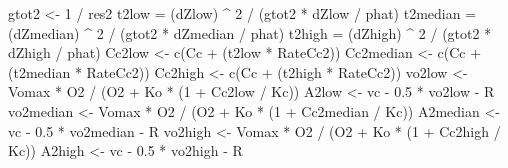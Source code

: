 \documentclass[
]{krantz}
\makeatletter
\newenvironment{Shaded}{\begin{snugshade}}{\end{snugshade}}
\newcommand{\DecValTok}[1]{\textcolor[rgb]{0.00,0.00,0.81}{#1}}
\newcommand{\FloatTok}[1]{\textcolor[rgb]{0.00,0.00,0.81}{#1}}
\newcommand{\FunctionTok}[1]{\textcolor[rgb]{0.00,0.00,0.00}{#1}}
\newcommand{\NormalTok}[1]{#1}
\newcommand{\OtherTok}[1]{\textcolor[rgb]{0.56,0.35,0.01}{#1}}
\newcommand{\SpecialCharTok}[1]{\textcolor[rgb]{0.00,0.00,0.00}{#1}}
\newenvironment{kframe}{%
\medskip{}
\setlength{\fboxsep}{.8em}
 \def\at@end@of@kframe{}%
 \ifinner\ifhmode%
  \def\at@end@of@kframe{\end{minipage}}%
  \begin{minipage}{\columnwidth}%
 \fi\fi%
 \def\FrameCommand##1{\hskip\@totalleftmargin \hskip-\fboxsep
 \colorbox{shadecolor}{##1}\hskip-\fboxsep
     \hskip-\linewidth \hskip-\@totalleftmargin \hskip\columnwidth}%
 \MakeFramed {\advance\hsize-\width
   \@totalleftmargin\z@ \linewidth\hsize
   \@setminipage}}%
 {\par\unskip\endMakeFramed%
 \at@end@of@kframe}
\renewenvironment{Shaded}{\begin{kframe}}{\end{kframe}}
\makeatother
\begin{document}
\begin{Shaded}
\begin{Highlighting}[]
\NormalTok{gtot2 }\OtherTok{\textless{}{-}} \DecValTok{1} \SpecialCharTok{/}\NormalTok{ res2}
\NormalTok{t2low }\OtherTok{=}\NormalTok{ (dZlow) }\SpecialCharTok{\^{}} \DecValTok{2} \SpecialCharTok{/}\NormalTok{ (gtot2 }\SpecialCharTok{*}\NormalTok{ dZlow }\SpecialCharTok{/}\NormalTok{ phat)}
\NormalTok{t2median }\OtherTok{=}\NormalTok{ (dZmedian) }\SpecialCharTok{\^{}} \DecValTok{2} \SpecialCharTok{/}\NormalTok{ (gtot2 }\SpecialCharTok{*}\NormalTok{ dZmedian }\SpecialCharTok{/}\NormalTok{ phat)}
\NormalTok{t2high }\OtherTok{=}\NormalTok{ (dZhigh) }\SpecialCharTok{\^{}} \DecValTok{2} \SpecialCharTok{/}\NormalTok{ (gtot2 }\SpecialCharTok{*}\NormalTok{ dZhigh }\SpecialCharTok{/}\NormalTok{ phat)}
\NormalTok{Cc2low }\OtherTok{\textless{}{-}} \FunctionTok{c}\NormalTok{(Cc }\SpecialCharTok{+}\NormalTok{ (t2low }\SpecialCharTok{*}\NormalTok{ RateCc2))}
\NormalTok{Cc2median }\OtherTok{\textless{}{-}} \FunctionTok{c}\NormalTok{(Cc }\SpecialCharTok{+}\NormalTok{ (t2median }\SpecialCharTok{*}\NormalTok{ RateCc2))}
\NormalTok{Cc2high }\OtherTok{\textless{}{-}} \FunctionTok{c}\NormalTok{(Cc }\SpecialCharTok{+}\NormalTok{ (t2high }\SpecialCharTok{*}\NormalTok{ RateCc2))}
\NormalTok{vo2low }\OtherTok{\textless{}{-}}\NormalTok{ Vomax }\SpecialCharTok{*}\NormalTok{ O2 }\SpecialCharTok{/}\NormalTok{ (O2 }\SpecialCharTok{+}\NormalTok{ Ko }\SpecialCharTok{*}\NormalTok{ (}\DecValTok{1} \SpecialCharTok{+}\NormalTok{ Cc2low }\SpecialCharTok{/}\NormalTok{ Kc)) }
\NormalTok{A2low }\OtherTok{\textless{}{-}}\NormalTok{ vc }\SpecialCharTok{{-}} \FloatTok{0.5} \SpecialCharTok{*}\NormalTok{ vo2low }\SpecialCharTok{{-}}\NormalTok{ R }
\NormalTok{vo2median }\OtherTok{\textless{}{-}}\NormalTok{ Vomax }\SpecialCharTok{*}\NormalTok{ O2 }\SpecialCharTok{/}\NormalTok{ (O2 }\SpecialCharTok{+}\NormalTok{ Ko }\SpecialCharTok{*}\NormalTok{ (}\DecValTok{1} \SpecialCharTok{+}\NormalTok{ Cc2median }\SpecialCharTok{/}\NormalTok{ Kc)) }
\NormalTok{A2median }\OtherTok{\textless{}{-}}\NormalTok{ vc }\SpecialCharTok{{-}} \FloatTok{0.5} \SpecialCharTok{*}\NormalTok{ vo2median }\SpecialCharTok{{-}}\NormalTok{ R }
\NormalTok{vo2high }\OtherTok{\textless{}{-}}\NormalTok{ Vomax }\SpecialCharTok{*}\NormalTok{ O2 }\SpecialCharTok{/}\NormalTok{ (O2 }\SpecialCharTok{+}\NormalTok{ Ko }\SpecialCharTok{*}\NormalTok{ (}\DecValTok{1} \SpecialCharTok{+}\NormalTok{ Cc2high }\SpecialCharTok{/}\NormalTok{ Kc)) }
\NormalTok{A2high }\OtherTok{\textless{}{-}}\NormalTok{ vc }\SpecialCharTok{{-}} \FloatTok{0.5} \SpecialCharTok{*}\NormalTok{ vo2high }\SpecialCharTok{{-}}\NormalTok{ R }


\end{Highlighting}
\end{Shaded}
\end{document}
